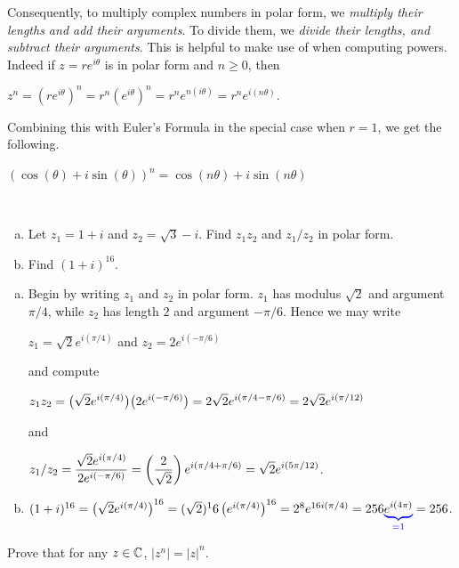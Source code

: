 \documentclass[11pt,fleqn,dvipsnames,usenames]{article}
\newcommand{\p}{\noindent}
\begin{document}
\p Consequently, to multiply complex numbers in polar form, we \emph{multiply their lengths and add their arguments}.  To divide them, we \emph{divide their lengths, and subtract their arguments}.  This is helpful to make use of when computing powers.  Indeed if $z = re^{i\theta}$ is in polar form and $n\geq 0$, then
\begin{center}
$z^{n} = \left(re^{i\theta}\right)^{n} = r^{n}\left(e^{i\theta}\right)^{n} = r^{n}e^{n(i\theta)} = r^{n}e^{i(n\theta)}$.
\end{center}
\vsp

\p Combining this with Euler's Formula in the special case when $r = 1$, we get the following.

\begin{theorem} $(\cos(\theta) + i\sin(\theta))^{n} = \cos(n\theta) + i\sin(n\theta)$
\end{theorem}

\begin{examples}~
\begin{enumerate}[(a)]
\item Let $z_{1} = 1 + i$ and $z_{2}  = \sqrt{3} - i$.  Find $z_{1}z_{2}$ and $z_{1}/z_{2}$ in polar form.
\item Find $(1 + i)^{16}$.
\end{enumerate}
\end{examples}
%
\begin{solution}
\begin{enumerate}[(a)]
\item Begin by writing $z_{1}$ and $z_{2}$ in polar form.  $z_{1}$ has modulus $\sqrt{2}$ and argument $\pi/4$, while $z_{2}$ has length $2$ and argument $-\pi/6$.  Hence we may write
\begin{center}
$z_{1} = \sqrt{2}e^{i(\pi/4)}$ and $z_{2} = 2e^{i(-\pi/6)}$
\end{center}
and compute
\begin{center}
$\displaystyle{z_{1}z_{2} = \big(\sqrt{2}e^{i(\pi/4)}\big)\big(2e^{i(-\pi/6)}\big) = 2\sqrt{2}e^{i(\pi/4-\pi/6)} = 2\sqrt{2}e^{i(\pi/12)}}$
\end{center}
and
\begin{center}
$\displaystyle{z_{1}/z_{2} = \frac{\sqrt{2}e^{i(\pi/4)}}{2e^{i(-\pi/6)}} = \left(\frac{2}{\sqrt{2}}\right)e^{i(\pi/4+\pi/6)} = \sqrt{2}e^{i(5\pi/12)}}$.
\end{center}
\item $(1+i)^{16} = \left(\sqrt{2}e^{i(\pi/4)}\right)^{16} = (\sqrt{2})^16\left(e^{i(\pi/4)}\right)^{16} = 2^{8}e^{16i(\pi/4)} = 256{\color{blue}\underbrace{{\color{black}e^{i(4\pi)}}}_{=1}} = 256$.
\end{enumerate}
\end{solution}
%
\begin{exercise}
Prove that for any $z\in\mathbb{C}$, $|z^{n}| = |z|^{n}$.
\end{exercise}
%
\end{document}
